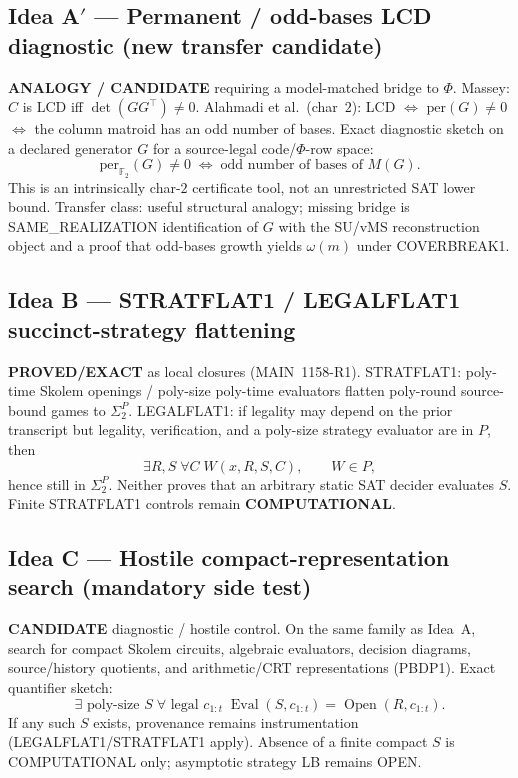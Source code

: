 \documentclass[11pt]{article}
\begin{document}
\subsection*{Idea A$'$ --- Permanent / odd-bases LCD diagnostic (new transfer candidate)}
\textbf{ANALOGY / CANDIDATE} requiring a model-matched bridge to $\Phi$.
Massey: $C$ is LCD iff $\det(GG^\top)\neq 0$.
Alahmadi et al.\ (char~$2$): LCD $\Leftrightarrow$ $\mathrm{per}(G)\neq 0$ $\Leftrightarrow$ the column matroid
has an odd number of bases. Exact diagnostic sketch on a declared generator $G$ for a
source-legal code/$\Phi$-row space:
\[
\mathrm{per}_{\mathbb F_2}(G)\neq 0\;\Leftrightarrow\;\text{odd number of bases of }M(G).
\]
This is an intrinsically char-$2$ certificate tool, not an unrestricted SAT lower bound.
Transfer class: useful structural analogy; missing bridge is SAME\_REALIZATION identification
of $G$ with the SU/vMS reconstruction object and a proof that odd-bases growth yields
$\omega(m)$ under COVERBREAK1.

\subsection*{Idea B --- STRATFLAT1 / LEGALFLAT1 succinct-strategy flattening}
\textbf{PROVED/EXACT} as local closures (MAIN~1158-R1).
STRATFLAT1: poly-time Skolem openings / poly-size poly-time evaluators flatten poly-round
source-bound games to $\Sigma_2^P$.
LEGALFLAT1: if legality may depend on the prior transcript but legality, verification, and a
poly-size strategy evaluator are in $P$, then
\[
\exists R,S\;\forall C\;W(x,R,S,C),\qquad W\in P,
\]
hence still in $\Sigma_2^P$. Neither proves that an arbitrary static SAT decider evaluates $S$.
Finite STRATFLAT1 controls remain \textbf{COMPUTATIONAL}.

\subsection*{Idea C --- Hostile compact-representation search (mandatory side test)}
\textbf{CANDIDATE} diagnostic / hostile control. On the same family as Idea~A, search for
compact Skolem circuits, algebraic evaluators, decision diagrams, source/history quotients,
and arithmetic/CRT representations (PBDP1). Exact quantifier sketch:
\[
\exists\text{ poly-size }S\;\forall\text{ legal }c_{1:t}\;
\operatorname{Eval}(S,c_{1:t})=\operatorname{Open}(R,c_{1:t}).
\]
If any such $S$ exists, provenance remains instrumentation (LEGALFLAT1/STRATFLAT1 apply).
Absence of a finite compact $S$ is COMPUTATIONAL only; asymptotic strategy LB remains OPEN.
\end{document}
